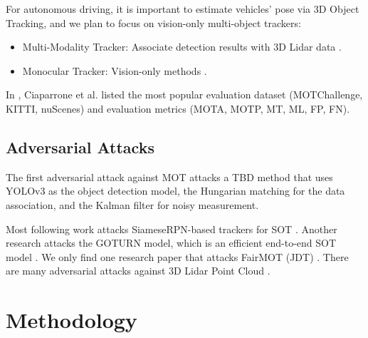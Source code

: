 For autonomous driving, it is important to estimate vehicles' pose via 3D Object Tracking, and we plan to focus on vision-only multi-object trackers: 

\begin{itemize}
    \item Multi-Modality Tracker: Associate detection results with 3D Lidar data \citep{weng20203d}.
    \item Monocular Tracker:  Vision-only methods \citep{wu2021track} \citep{hu2022monocular}.
\end{itemize}

In \citep{ciaparrone2020deep}, Ciaparrone et al. listed the most popular evaluation dataset (MOTChallenge, KITTI, nuScenes) and evaluation metrics (MOTA, MOTP, MT, ML, FP, FN).



\subsection{Adversarial Attacks}

The first adversarial attack against MOT attacks a TBD method that uses YOLOv3 as the object detection model, the Hungarian matching for the data association, and the Kalman filter for noisy measurement.

Most following work attacks SiameseRPN-based trackers for SOT \citep{wu2019sta} \citep{liang2020efficient} \citep{guo2020spark} \citep{chen2020one} \citep{yan2020cooling}. Another research attacks the GOTURN model, which is an efficient end-to-end SOT model \citep{wiyatno2019physical}. We only find one research paper that attacks FairMOT (JDT) \citep{lin2021trasw}. There are many adversarial attacks against 3D Lidar Point Cloud \citep{cheng2021universal} \citep{cheng2022non} \citep{wang2022adversary}.

\section{Methodology}



